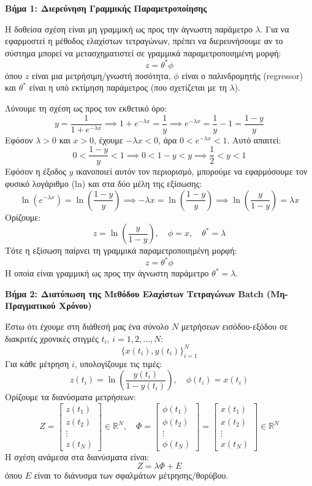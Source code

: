 \documentclass[a4paper,11pt]{article}
\begin{document}
\begin{answer}
\textbf{Βήμα 1: Διερεύνηση Γραμμικής Παραμετροποίησης}

Η δοθείσα σχέση είναι μη γραμμική ως προς την άγνωστη παράμετρο $\lambda$. Για να εφαρμοστεί η μέθοδος ελαχίστων τετραγώνων, πρέπει να διερευνήσουμε αν το σύστημα μπορεί να μετασχηματιστεί σε γραμμικά παραμετροποιημένη μορφή:
\[ z = \theta^* \phi \]
όπου $z$ είναι μια μετρήσιμη/γνωστή ποσότητα, $\phi$ είναι ο παλινδρομητής (regressor) και $\theta^*$ είναι η υπό εκτίμηση παράμετρος (που σχετίζεται με τη $\lambda$).

Λύνουμε τη σχέση ως προς τον εκθετικό όρο:
\[ y = \frac{1}{1 + e^{-\lambda x}} \implies 1 + e^{-\lambda x} = \frac{1}{y} \implies e^{-\lambda x} = \frac{1}{y} - 1 = \frac{1-y}{y} \]
Εφόσον $\lambda > 0$ και $x > 0$, έχουμε $-\lambda x < 0$, άρα $0 < e^{-\lambda x} < 1$. Αυτό απαιτεί:
\[ 0 < \frac{1-y}{y} < 1 \implies 0 < 1-y < y \implies \frac{1}{2} < y < 1 \]
Εφόσον η έξοδος $y$ ικανοποιεί αυτόν τον περιορισμό, μπορούμε να εφαρμόσουμε τον φυσικό λογάριθμο (ln) και στα δύο μέλη της εξίσωσης:
\[ \ln\left(e^{-\lambda x}\right) = \ln\left(\frac{1-y}{y}\right) \implies -\lambda x = \ln\left(\frac{1-y}{y}\right) \implies \ln\left(\frac{y}{1-y}\right) = \lambda x \]
Ορίζουμε:
\[ z = \ln\left(\frac{y}{1-y}\right), \quad \phi = x, \quad \theta^* = \lambda \]
Τότε η εξίσωση παίρνει τη γραμμικά παραμετροποιημένη μορφή:
\[ z = \theta^* \phi \]
Η οποία είναι γραμμική ως προς την άγνωστη παράμετρο $\theta^* = \lambda$.

\textbf{Βήμα 2: Διατύπωση της Μεθόδου Ελαχίστων Τετραγώνων Batch (Μη-Πραγματικού Χρόνου)}

Έστω ότι έχουμε στη διάθεσή μας ένα σύνολο $N$ μετρήσεων εισόδου-εξόδου σε διακριτές χρονικές στιγμές $t_i$, $i = 1, 2, \dots, N$:
\[ \{x(t_i), y(t_i)\}_{i=1}^N \]
Για κάθε μέτρηση $i$, υπολογίζουμε τις τιμές:
\[ z(t_i) = \ln\left(\frac{y(t_i)}{1 - y(t_i)}\right), \quad \phi(t_i) = x(t_i) \]
Ορίζουμε τα διανύσματα μετρήσεων:
\[ Z = \begin{bmatrix} z(t_1) \\ z(t_2) \\ \vdots \\ z(t_N) \end{bmatrix} \in \mathbb{R}^N, \quad \Phi = \begin{bmatrix} \phi(t_1) \\ \phi(t_2) \\ \vdots \\ \phi(t_N) \end{bmatrix} = \begin{bmatrix} x(t_1) \\ x(t_2) \\ \vdots \\ x(t_N) \end{bmatrix} \in \mathbb{R}^N \]
Η σχέση ανάμεσα στα διανύσματα είναι:
\[ Z = \lambda \Phi + E \]
όπου $E$ είναι το διάνυσμα των σφαλμάτων μέτρησης/θορύβου.


\end{answer}
\end{document}
